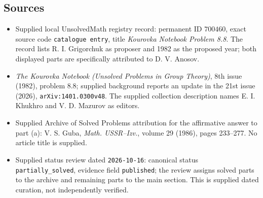 \documentclass[11pt]{article}
\begin{document}
\subsection{Sources}
\begin{itemize}
\item Supplied local UnsolvedMath registry record: permanent ID \(700460\), exact source code \texttt{catalogue entry}, title \emph{Kourovka Notebook Problem 8.8}. The record lists R. I. Grigorchuk as proposer and 1982 as the proposed year; both displayed parts are specifically attributed to D. V. Anosov.
\item \emph{The Kourovka Notebook (Unsolved Problems in Group Theory)}, 8th issue (1982), problem 8.8; supplied background reports an update in the 21st issue (2026), \texttt{arXiv:1401.0300v48}. The supplied collection description names E. I. Khukhro and V. D. Mazurov as editors.
\item Supplied Archive of Solved Problems attribution for the affirmative answer to part (a): V. S. Guba, \emph{Math. USSR--Izv.}, volume 29 (1986), pages 233--277. No article title is supplied.
\item Supplied status review dated \texttt{2026-10-16}: canonical status \texttt{partially\_solved}, evidence field \texttt{published}; the review assigns solved parts to the archive and remaining parts to the main section. This is supplied dated curation, not independently verified.
\end{itemize}
\end{document}
